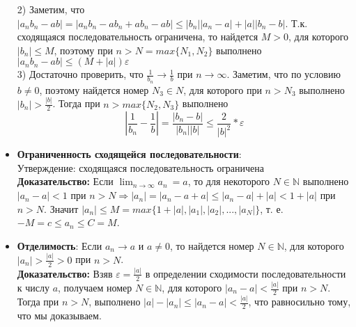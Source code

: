 \documentclass[12pt,a4paper]{article}
\begin{document}
\begin{itemize}
    2) Заметим, что $|a_n b_n - a b| = |a_n b_n - a b_n + a b_n - a b| \leq |b_n| |a_n - a| + |a| |b_n - b|$. Т.к. сходящаяся последовательность ограничена, то найдется $M > 0$, для которого $|b_n| \leq M$, поэтому при  $n > N = max\{ N_1, N_2\}$ выполнено $|a_n b_n - a b| \leq (M + |a|)\varepsilon$\\
    3) Достаточно проверить, что $\frac{1}{b_n} \to \frac{1}{b}$ при $n \to \infty$. Заметим, что по условию $b \neq 0$, поэтому найдется номер $N_3 \in N$, для которого при $n > N_3$ выполнено $|b_n| > \frac{|b|}{2}$. Тогда при $n > max \{N_2, N_3\}$ выполнено \[|\frac{1}{b_n} - \frac{1}{b}| = \frac{|b_n - b|}{|b_n| |b|} \leq \frac{2}{|b|^2} * \varepsilon\]
    \item \textbf{Ограниченность сходящейся последовательности}:\\
    Утверждение: сходящаяся последовательность ограничена\\
    \textbf{Доказательство:} Если $\lim_{n \to \infty} a_n\ = a$, то для некоторого $N \in \mathbb{N}$ выполнено  
    $|a_n - a| < 1$ при $n > N  \Rightarrow |a_n| = |a_n - a + a| \leq |a_n - a| + |a| < 1 + |a|$ при $n > N$.
    Значит $|a_n| \leq M = max\{1 + |a|, |a_1|, |a_2|, ..., |a_N|\}$, т. е. $-M = c \leq a_n \leq C = M$.\\
    \item \textbf{Отделимость}:
    Если $a_n \to a$ и $a \neq 0$, то найдется номер $N \in \mathbb{N}$, для которого $|a_n| > \frac{|a|}{2} > 0$ при $n > N$.\\
    \textbf{Доказательство:} Взяв $\varepsilon = \frac{|a|}{2}$ в определении сходимости последовательности к числу $a$, получаем номер $N \in \mathbb{N}$, для которого $|a_n - a| < \frac{|a|}{2}$ при $n > N$. Тогда при $n > N$, выполнено $|a| - |a_n| \leq |a_n - a| < \frac{|a|}{2}$, что равносильно тому, что мы доказываем.
  
\end{itemize}
\end{document}
